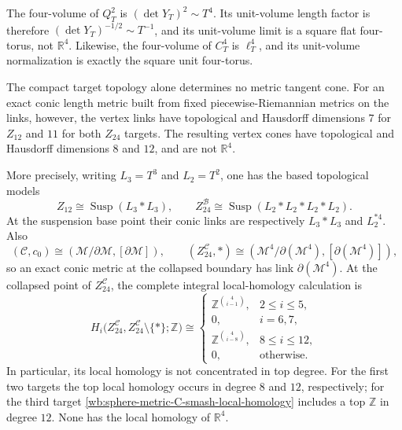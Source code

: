 \begin{corollary}
\label{wb:sphere-metric-unit-volume}
The four-volume of \(Q_T^2\) is \((\det Y_T)^2\sim T^4\).  Its unit-volume
length factor is therefore \((\det Y_T)^{-1/2}\sim T^{-1}\), and its
unit-volume limit is a square flat four-torus, not \(\mathbb R^4\).
Likewise, the four-volume of \(C_T^4\) is \(\ell_T^4\), and its unit-volume
normalization is exactly the square unit four-torus.
\end{corollary}

\begin{proposition}
\label{wb:sphere-metric-tangent-scope}
The compact target topology alone determines no metric tangent cone.
For an exact conic length metric built from fixed piecewise-Riemannian
metrics on the links, however, the vertex links have topological and
Hausdorff dimensions \(7\) for \(Z_{12}\) and \(11\) for both
\(Z_{24}\) targets.  The resulting vertex cones have topological and
Hausdorff dimensions \(8\) and \(12\), and are not \(\mathbb R^4\).

More precisely, writing \(L_3=T^3\) and \(L_2=T^2\), one has the based
topological models
\[
 Z_{12}\cong\operatorname{Susp}(L_3*L_3),
 \qquad
 Z_{24}^{\mathcal B}
 \cong\operatorname{Susp}(L_2*L_2*L_2*L_2).
\]
At the suspension base point their conic links are respectively
\(L_3*L_3\) and \(L_2^{*4}\).  Also
\[
 (\mathcal C,c_0)
 \cong
 (\mathcal M/\partial\mathcal M,[\partial\mathcal M]),
 \qquad
 (Z_{24}^{\mathcal C},*)
 \cong
 (\mathcal M^4/\partial(\mathcal M^4),
  [\partial(\mathcal M^4)]),
\]
so an exact conic metric at the collapsed boundary has link
\(\partial(\mathcal M^4)\).  At the collapsed point of
\(Z_{24}^{\mathcal C}\), the complete integral local-homology calculation is
\begin{equation}
 H_i\bigl(Z_{24}^{\mathcal C},
          Z_{24}^{\mathcal C}\setminus\{*\};\mathbb Z\bigr)
 \cong
 \begin{cases}
  \mathbb Z^{\binom4{i-1}},&2\leq i\leq5,\\
  0,&i=6,7,\\
  \mathbb Z^{\binom4{i-8}},&8\leq i\leq12,\\
  0,&\text{otherwise}.
 \end{cases}
 \label{wb:sphere-metric-C-smash-local-homology}
\end{equation}
In particular, its local homology is not concentrated in top degree.  For
the first two targets the top local homology occurs in degree \(8\) and
\(12\), respectively; for the third target
\eqref{wb:sphere-metric-C-smash-local-homology} includes a top
\(\mathbb Z\) in degree \(12\).  None has the local homology of
\(\mathbb R^4\).


\end{proposition}
